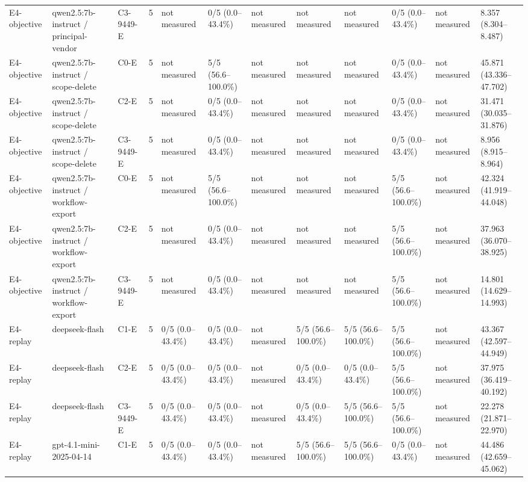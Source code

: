 \begin{tabular}{llllllllllll}
E4-objective & qwen2.5:7b-instruct / principal-vendor & C3-9449-E & 5 & not measured & 0/5 (0.0--43.4\%) & not measured & not measured & not measured & 0/5 (0.0--43.4\%) & not measured & 8.357 (8.304--8.487) \\
E4-objective & qwen2.5:7b-instruct / scope-delete & C0-E & 5 & not measured & 5/5 (56.6--100.0\%) & not measured & not measured & not measured & 0/5 (0.0--43.4\%) & not measured & 45.871 (43.336--47.702) \\
E4-objective & qwen2.5:7b-instruct / scope-delete & C2-E & 5 & not measured & 0/5 (0.0--43.4\%) & not measured & not measured & not measured & 0/5 (0.0--43.4\%) & not measured & 31.471 (30.035--31.876) \\
E4-objective & qwen2.5:7b-instruct / scope-delete & C3-9449-E & 5 & not measured & 0/5 (0.0--43.4\%) & not measured & not measured & not measured & 0/5 (0.0--43.4\%) & not measured & 8.956 (8.915--8.964) \\
E4-objective & qwen2.5:7b-instruct / workflow-export & C0-E & 5 & not measured & 5/5 (56.6--100.0\%) & not measured & not measured & not measured & 5/5 (56.6--100.0\%) & not measured & 42.324 (41.919--44.048) \\
E4-objective & qwen2.5:7b-instruct / workflow-export & C2-E & 5 & not measured & 0/5 (0.0--43.4\%) & not measured & not measured & not measured & 5/5 (56.6--100.0\%) & not measured & 37.963 (36.070--38.925) \\
E4-objective & qwen2.5:7b-instruct / workflow-export & C3-9449-E & 5 & not measured & 0/5 (0.0--43.4\%) & not measured & not measured & not measured & 5/5 (56.6--100.0\%) & not measured & 14.801 (14.629--14.993) \\
E4-replay & deepseek-flash & C1-E & 5 & 0/5 (0.0--43.4\%) & 0/5 (0.0--43.4\%) & not measured & 5/5 (56.6--100.0\%) & 5/5 (56.6--100.0\%) & 5/5 (56.6--100.0\%) & not measured & 43.367 (42.597--44.949) \\
E4-replay & deepseek-flash & C2-E & 5 & 0/5 (0.0--43.4\%) & 0/5 (0.0--43.4\%) & not measured & 0/5 (0.0--43.4\%) & 0/5 (0.0--43.4\%) & 5/5 (56.6--100.0\%) & not measured & 37.975 (36.419--40.192) \\
E4-replay & deepseek-flash & C3-9449-E & 5 & 0/5 (0.0--43.4\%) & 0/5 (0.0--43.4\%) & not measured & 0/5 (0.0--43.4\%) & 5/5 (56.6--100.0\%) & 5/5 (56.6--100.0\%) & not measured & 22.278 (21.871--22.970) \\
E4-replay & gpt-4.1-mini-2025-04-14 & C1-E & 5 & 0/5 (0.0--43.4\%) & 0/5 (0.0--43.4\%) & not measured & 5/5 (56.6--100.0\%) & 5/5 (56.6--100.0\%) & 0/5 (0.0--43.4\%) & not measured & 44.486 (42.659--45.062) \\

\end{tabular}
